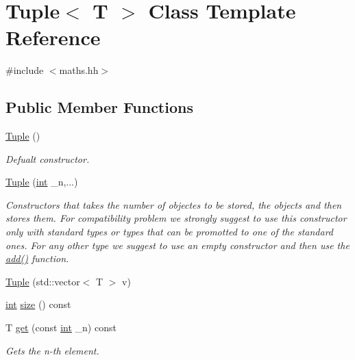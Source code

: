 \hypertarget{class_tuple}{}\section{Tuple$<$ T $>$ Class Template Reference}
\label{class_tuple}


{\ttfamily \#include $<$maths.\+hh$>$}

\subsection*{Public Member Functions}
\begin{DoxyCompactItemize}
\item 
\mbox{\hyperlink{class_tuple_ae8bde0e2215d6d5235a2a45195f7bfae}{Tuple}} ()
\begin{DoxyCompactList}\small\item\em Defualt constructor. \end{DoxyCompactList}\item 
\mbox{\hyperlink{class_tuple_af64f6017bf08af095addedf084863f22}{Tuple}} (\mbox{\hyperlink{draw_8hh_aa620a13339ac3a1177c86edc549fda9b}{int}} \+\_\+n,...)
\begin{DoxyCompactList}\small\item\em Constructors that takes the number of objectes to be stored, the objects and then stores them. For compatibility problem we strongly suggest to use this constructor only with standard types or types that can be promotted to one of the standard ones. For any other type we suggest to use an empty constructor and then use the {\ttfamily \mbox{\hyperlink{class_tuple_a5d3ee2809d790543195a6e2075aef7d0}{add()}}} function. \end{DoxyCompactList}\item 
\mbox{\hyperlink{class_tuple_adff6ec647c0f16a061adae02814ad45e}{Tuple}} (std\+::vector$<$ T $>$ v)
\item 
\mbox{\hyperlink{draw_8hh_aa620a13339ac3a1177c86edc549fda9b}{int}} \mbox{\hyperlink{class_tuple_a8fffdb4c6d86d10fcf4aee1b0261e4ba}{size}} () const
\item 
T \mbox{\hyperlink{class_tuple_aabf82c5d0f19c9a8f6a8f01d95801162}{get}} (const \mbox{\hyperlink{draw_8hh_aa620a13339ac3a1177c86edc549fda9b}{int}} \+\_\+n) const
\begin{DoxyCompactList}\small\item\em Gets the n-\/th element. \end{DoxyCompactList}\item 

\end{DoxyCompactItemize}
